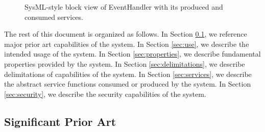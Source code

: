 \documentclass[a4paper]{arrowhead}
\begin{document}
\begin{figure}[ht!]
  \centering
  \caption{SysML-style block view of EventHandler with its produced and consumed services.}
  \label{fig:system}
\end{figure}

The rest of this document is organized as follows.
In Section \ref{sec:prior_art}, we reference major prior art capabilities of the system.
In Section \ref{sec:use}, we describe the intended usage of the system.
In Section \ref{sec:properties}, we describe fundamental properties provided by the system.
In Section \ref{sec:delimitations}, we describe delimitations of capabilities of the system.
In Section \ref{sec:services}, we describe the abstract service functions consumed or produced by the system.
In Section \ref{sec:security}, we describe the security capabilities of the system.

\newpage

\subsection{Significant Prior Art}
\label{sec:prior_art}
\end{document}
